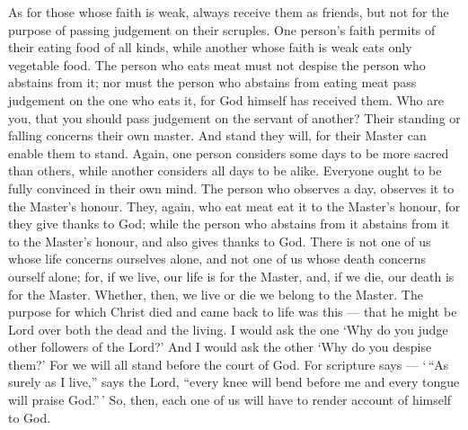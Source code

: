  As for those whose faith is weak, always receive them as
friends, but not for the purpose of passing judgement on their scruples.
 One person's faith permits of their eating food of all
kinds, while another whose faith is weak eats only vegetable food.
 The person who eats meat must not despise the person who
abstains from it; nor must the person who abstains from eating meat pass
judgement on the one who eats it, for God himself has received them.
 Who are you, that you should pass judgement on the servant
of another? Their standing or falling concerns their own master. And
stand they will, for their Master can enable them to stand. 
Again, one person considers some days to be more sacred than others,
while another considers all days to be alike. Everyone ought to be fully
convinced in their own mind.  The person who observes a day,
observes it to the Master's honour. They, again, who eat meat eat it to
the Master's honour, for they give thanks to God; while the person who
abstains from it abstains from it to the Master's honour, and also gives
thanks to God.  There is not one of us whose life concerns
ourselves alone, and not one of us whose death concerns ourself alone;
 for, if we live, our life is for the Master, and, if we
die, our death is for the Master. Whether, then, we live or die we
belong to the Master.  The purpose for which Christ died and
came back to life was this --- that he might be Lord over both the dead
and the living.  I would ask the one `Why do you judge
other followers of the Lord?' And I would ask the other `Why do you
despise them?' For we will all stand before the court of God.
 For scripture says --- `\,``As surely as I live,'' says
the Lord, ``every knee will bend before me and every tongue will praise
God.''\,'  So, then, each one of us will have to render
account of himself to God.

